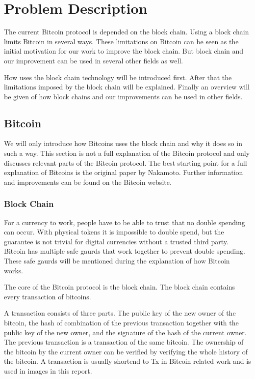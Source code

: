 \chapter{Problem Description}

The current Bitcoin protocol is depended on the block chain. 
Using a block chain limits Bitcoin in several ways.
These limitations on Bitcoin can be seen as the initial motivation 
for our work to improve the block chain.
But block chain and our improvement can be used in several other fields as well.

How uses the block chain technology will be introduced first.
After that the limitations imposed by the block chain will be explained.
Finally an overview will be given of how block chains and our improvements can be used in other fields.

\section{Bitcoin}
We will only introduce how Bitcoins uses the block chain and why it does so in such a way.
This section is not a full explanation of the Bitcoin protocol
and only discusses relevant parts of the Bitcoin protocol.
The best starting point for a full explanation of Bitcoins 
is the original paper by Nakamoto\cite{Nakamoto-bitcoin}.
Further information and improvements can be found on the Bitcoin website\cite{Bitcoin.org-site}.

\subsection{Block Chain}
For a currency to work, people have to be able to trust that no double spending can occur.
With physical tokens it is impossible to double spend,
but the guarantee is not trivial for digital currencies without a trusted third party.
Bitcoin has multiple safe gaurds that work together to prevent double spending.
These safe gaurds will be mentioned during the explanation of how Bitcoin works.

The core of the Bitcoin protocol is the block chain.
The block chain contains every transaction of bitcoins.

A transaction consists of three parts.
The public key of the new owner of the bitcoin,
the hash of combination of the previous transaction together with the public key of the new owner,
and the signature of the hash of the current owner.
The previous transaction is a transaction of the same bitcoin.
The ownership of the bitcoin by the current owner can be verified
by verifying the whole history of the bitcoin.
A transaction is usually shortend to Tx in Bitcoin related work and is used in images in this report.

